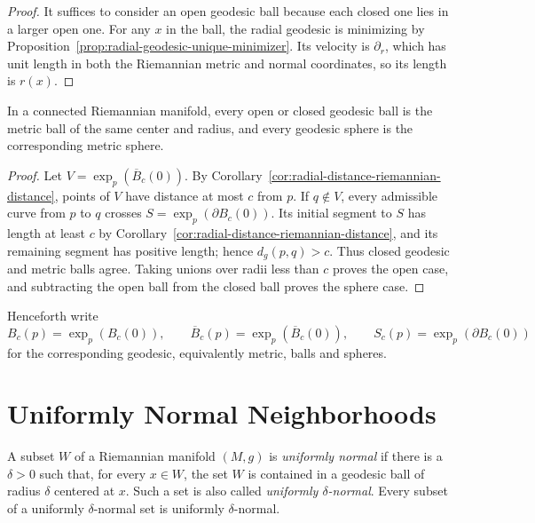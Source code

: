 \begin{proof}
\sketch
It suffices to consider an open geodesic ball because each closed one lies in
a larger open one.  For any $x$ in the ball, the radial geodesic is minimizing
by Proposition~\ref{prop:radial-geodesic-unique-minimizer}.  Its velocity is
$\partial_r$, which has unit length in both the Riemannian metric and normal
coordinates, so its length is $r(x)$.
\end{proof}

\begin{corollary}
\label{cor:geodesic-ball-metric-ball}






In a connected Riemannian manifold, every open or closed geodesic ball is the
metric ball of the same center and radius, and every geodesic sphere is the
corresponding metric sphere.
\end{corollary}

\begin{proof}
\sketch
Let $V=\exp_p(\overline B_c(0))$.  By
Corollary~\ref{cor:radial-distance-riemannian-distance}, points of $V$ have
distance at most $c$ from $p$.  If $q\notin V$, every admissible curve from
$p$ to $q$ crosses $S=\exp_p(\partial B_c(0))$.  Its initial segment to $S$
has length at least $c$ by
Corollary~\ref{cor:radial-distance-riemannian-distance}, and its remaining
segment has positive length; hence $d_g(p,q)>c$.  Thus closed geodesic and
metric balls agree.  Taking unions over radii less than $c$ proves the open
case, and subtracting the open ball from the closed ball proves the sphere
case.
\end{proof}

Henceforth write
\[
B_c(p)=\exp_p(B_c(0)),
\qquad
\overline B_c(p)=\exp_p(\overline B_c(0)),
\qquad
S_c(p)=\exp_p(\partial B_c(0))
\]
for the corresponding geodesic, equivalently metric, balls and spheres.
\section{Uniformly Normal Neighborhoods}

A subset $W$ of a Riemannian manifold $(M,g)$ is \emph{uniformly normal} if
there is a $\delta>0$ such that, for every $x\in W$, the set $W$ is contained
in a geodesic ball of radius $\delta$ centered at $x$. Such a set is also called
\emph{uniformly $\delta$-normal}. Every subset of a uniformly
$\delta$-normal set is uniformly $\delta$-normal.

